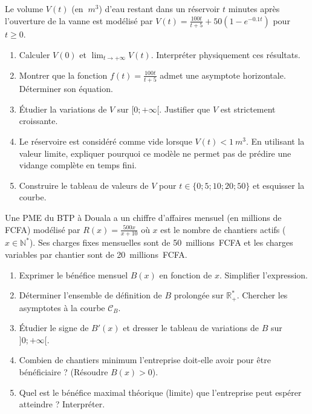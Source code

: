 \documentclass[11pt]{article}
\begin{document}
\begin{exercice}
Le volume $V(t)$ (en $\SI{}{m^3}$) d'eau restant dans un réservoir $t$ minutes après l'ouverture de la vanne est modélisé par $V(t) = \frac{100t}{t+5} + 50(1 - e^{-0.1t})$ pour $t \geq 0$.
\begin{enumerate}
    \item Calculer $V(0)$ et $\lim_{t \to +\infty} V(t)$. Interpréter physiquement ces résultats.
    \item Montrer que la fonction $f(t) = \frac{100t}{t+5}$ admet une asymptote horizontale. Déterminer son équation.
    \item Étudier la variations de $V$ sur $[0; +\infty[$. Justifier que $V$ est strictement croissante.
    \item Le réservoire est considéré comme vide lorsque $V(t) < \SI{1}{m^3}$. En utilisant la valeur limite, expliquer pourquoi ce modèle ne permet pas de prédire une vidange complète en temps fini.
    \item Construire le tableau de valeurs de $V$ pour $t \in \{0; 5; 10; 20; 50\}$ et esquisser la courbe.
\end{enumerate}
\end{exercice}

\begin{exercice}
Une PME du BTP à Douala a un chiffre d'affaires mensuel (en millions de FCFA) modélisé par $R(x) = \frac{500x}{x+10}$ où $x$ est le nombre de chantiers actifs ($x \in \mathbb{N}^*$). Ses charges fixes mensuelles sont de \SI{50}{millions FCFA} et les charges variables par chantier sont de \SI{20}{millions FCFA}.
\begin{enumerate}
    \item Exprimer le bénéfice mensuel $B(x)$ en fonction de $x$. Simplifier l'expression.
    \item Déterminer l'ensemble de définition de $B$ prolongée sur $\mathbb{R}^*_+$. Chercher les asymptotes à la courbe $\mathcal{C}_B$.
    \item Étudier le signe de $B'(x)$ et dresser le tableau de variations de $B$ sur $]0; +\infty[$.
    \item Combien de chantiers minimum l'entreprise doit-elle avoir pour être bénéficiaire ? (Résoudre $B(x) > 0$).
    \item Quel est le bénéfice maximal théorique (limite) que l'entreprise peut espérer atteindre ? Interpréter.
\end{enumerate}
\end{exercice}
\end{document}

